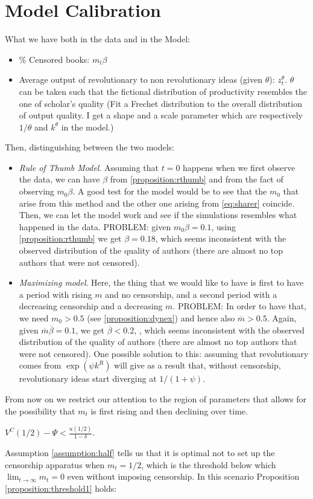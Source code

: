 \section{Model Calibration}
What we have both in the data and in the Model:
\begin{itemize}
\item \% Censored books: $m_t \beta$
\item Average output of revolutionary to  non revolutionary ideas (given $\theta$): $z_t^\theta$. $\theta$ can be taken such that the fictional distribution of productivity resembles the one of scholar's quality (Fit a Frechet distribution to the overall distribution of output quality. I get a shape and a scale parameter which are respectively $1/\theta$ and $k^\theta$ in the model.)
\end{itemize}
Then, distinguishing between the two models:
\begin{itemize}
\item \textit{Rule of Thumb Model}. Assuming that $t=0$ happens when we first observe the data, we can have $\beta$ from \ref{proposition:rthumb} and from the fact of observing $m_0\beta$. A good test for the model would be to see that the $m_0$ that arise from this method and the other one arising from \ref{eq:sharer} coincide. Then, we can let the model work and see if the simulations resembles what happened in the data. PROBLEM: given $m_0\beta=0.1$, using \ref{proposition:rthumb} we get $\beta=0.18$, which seems inconsistent with the observed distribution of the quality of authors (there are almost no top authors that were not censored).
\item \textit{Maximizing model}. Here, the thing that we would like to have is first to have a period with rising $m$ and no censorship, and a second period with a decreasing censorship and a decreasing $m$. PROBLEM: In order to have that, we need $m_0>0.5$ (see \ref{proposition:dynex}) and hence also $\overline{m}>0.5$. Again, given $\overline{m}\overline{\beta}=0.1$, we get $\overline{\beta}<0.2$, , which seems inconsistent with the observed distribution of the quality of authors (there are almost no top authors that were not censored).
One possible solution to this: assuming that revolutionary comes from $\exp(\psi k^R)$ will give as a result that, without censorship, revolutionary ideas start diverging at $1/(1+\psi)$.
\end{itemize}



From now on we restrict our attention to the region of parameters that allows for the possibility that $m_t$ is first rising and then declining over time.
\begin{assumption}\label{assumption:half}
$V^C(1/2)-\Psi<\frac{u(1/2)}{1-\delta}$.
\end{assumption}
Assumption \ref{assumption:half} tells us that it is optimal not to set up the censorship apparatus when $m_t=1/2$, which is the threshold below which $\lim_{t\to\infty} m_t=0$ even without imposing censorship. In this scenario Proposition \ref{proposition:threshold1} holds:

